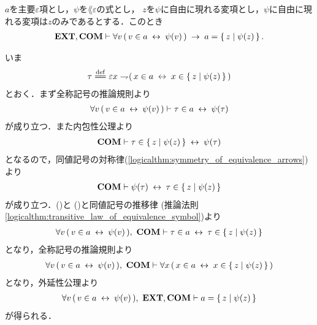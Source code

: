 	\begin{screen}
		\begin{thm}
		\label{thm:equivalent_formula_rewriting_2}
			$a$を主要$\varepsilon$項とし，$\psi$を$\lang{\varepsilon}$の式とし，
			$z$を$\psi$に自由に現れる変項とし，$\psi$に自由に現れる変項は$z$のみであるとする．このとき
			\begin{align}
				\mbox{{\bf EXT}},\mbox{\bf COM} \vdash \forall v\, (\, v \in a \hspace{0.25em}\leftrightarrow\hspace{0.25em} \psi(v)\, )
				\hspace{0.25em}\rightarrow\hspace{0.25em} a = \left\{\, z \mid \psi(z)\, \right\}.
			\end{align}
		\end{thm}
	\end{screen}
	
	\begin{sketch}
		いま
		\begin{align}
			\tau \defeq 
			\varepsilon x \negation (\, x \in a \lrarrow x \in \Set{z}{\psi(z)}\, )
		\end{align}
		とおく．まず全称記号の推論規則より
		\begin{align}
			\forall v\, (\, v \in a \hspace{0.25em}\leftrightarrow\hspace{0.25em} \psi(v)\, )
			\vdash \tau \in a \hspace{0.25em}\leftrightarrow\hspace{0.25em} \psi(\tau)
			\label{fom:equivalent_formula_rewriting_2_1}
		\end{align}
		が成り立つ．また内包性公理より
		\begin{align}
			\mbox{\bf COM} \vdash \tau \in \left\{\, z \mid \psi(z)\, \right\} \hspace{0.25em}\leftrightarrow\hspace{0.25em} \psi(\tau)
		\end{align}
		となるので，同値記号の対称律(\ref{logicalthm:symmetry_of_equivalence_arrows})より
		\begin{align}
			\mbox{\bf COM} \vdash \psi(\tau) \hspace{0.25em}\leftrightarrow\hspace{0.25em} \tau \in \left\{\, z \mid \psi(z)\, \right\}
			\label{fom:equivalent_formula_rewriting_2_2}
		\end{align}
		が成り立つ．()と
		()と同値記号の推移律
		(推論法則\ref{logicalthm:transitive_law_of_equivalence_symbol})より
		\begin{align}
			\forall v\, (\, v \in a \hspace{0.25em}\leftrightarrow\hspace{0.25em} \psi(v)\, ),\ \mbox{\bf COM} \vdash
			\tau \in a \hspace{0.25em}\leftrightarrow\hspace{0.25em} \tau \in \left\{\, z \mid \psi(z)\, \right\}
		\end{align}
		となり，全称記号の推論規則より
		\begin{align}
			\forall v\, (\, v \in a \hspace{0.25em}\leftrightarrow\hspace{0.25em} \psi(v)\, ),\ \mbox{\bf COM} \vdash
			\forall x\, (\, x \in a \hspace{0.25em}\leftrightarrow\hspace{0.25em} x \in \left\{\, z \mid \psi(z)\, \right\}\, )
		\end{align}
		となり，外延性公理より
		\begin{align}
			\forall v\, (\, v \in a \hspace{0.25em}\leftrightarrow\hspace{0.25em} \psi(v)\, ),\ \mbox{{\bf EXT}},\mbox{\bf COM} \vdash
			a = \left\{\, z \mid \psi(z)\, \right\}
		\end{align}
		が得られる．
		\QED
	\end{sketch}
	

